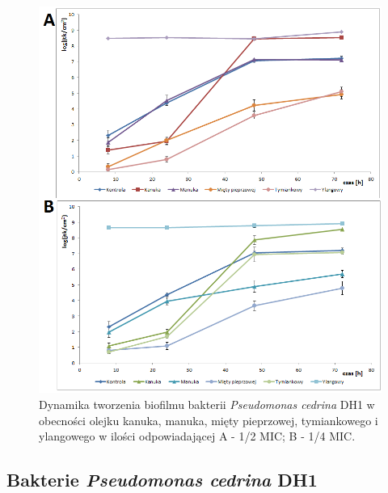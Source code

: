 \documentclass[11pt,a4paper]{report}
\begin{document}
\begin{figure}[!h]
\begin{center}
\includegraphics[scale=0.7]{img/pc-b.png}
\caption{Dynamika tworzenia biofilmu bakterii \textit{Pseudomonas cedrina} DH1 w obecności olejku kanuka, manuka, mięty pieprzowej, tymiankowego i ylangowego w ilości odpowiadającej A - 1/2 MIC; B - 1/4 MIC.}\label{pc-b}
\end{center} 
\end{figure}

\clearpage

\subsection{Bakterie \textit{Pseudomonas cedrina} DH1}
\end{document}
